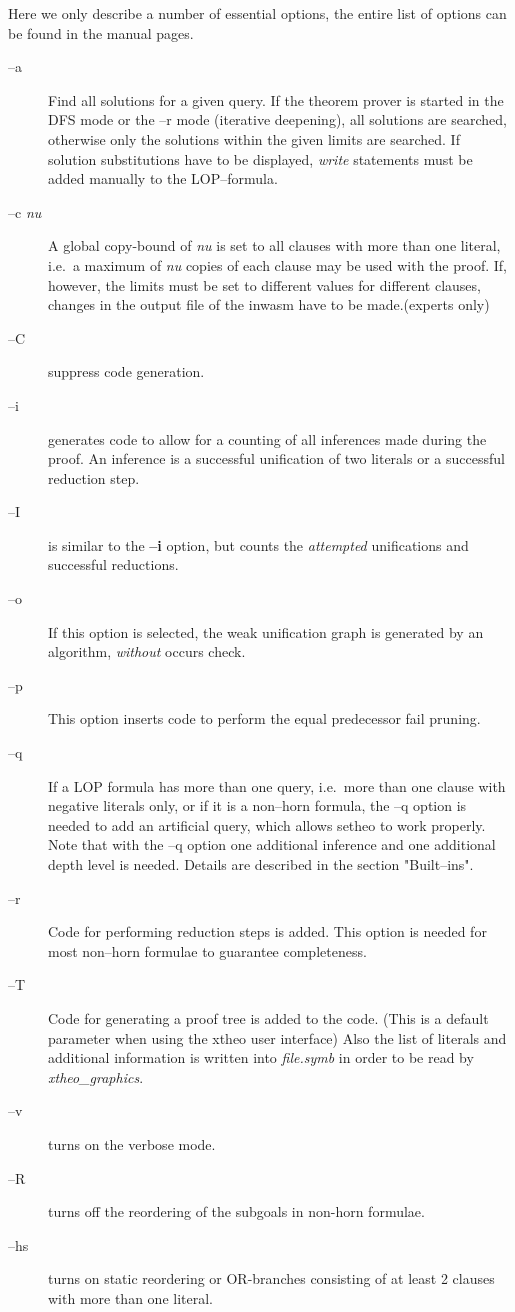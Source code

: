 Here we only describe a number of essential options, the entire list of
options can be found in the manual pages.
\begin{description}
\item[--a]
Find all solutions for a given query. If the theorem prover is started
in the DFS mode or the --r mode (iterative deepening), all solutions
are searched, otherwise only the solutions within the given 
limits are searched. If solution substitutions have to be displayed,
{\it write\/} statements must be added manually to the LOP--formula.
\item[--c {\it nu\/}]
A global copy-bound of {\it nu\/} is set to all clauses with more than
one literal, i.e.\ a maximum of {\it nu\/} copies of each clause may be
used with the proof. If, however, the limits must be set to different values
for different clauses, changes in the output file of the inwasm have to
be made.(experts only)
\item[--C] suppress code generation.
\item[--i] generates code to allow for a counting of all inferences
made during the proof. An inference is a successful unification of two
literals or a successful reduction step.
\item[--I] is similar to the {\bf --i} option, but counts the {\em attempted\/}
unifications and successful reductions.
\item[--o]
If this option is selected, the weak unification graph is generated
by an algorithm, {\it without\/} occurs check.
\item[--p]
This option inserts code to perform the equal predecessor fail pruning.
\item[--q] If a LOP formula has more than one query, i.e.\ more than one
clause with negative literals only, or if it is a non--horn formula,
the --q option is needed to add an artificial query, which allows setheo
to work properly. Note that with the --q option one additional inference
and one additional depth level is needed.
Details are described in the section "Built--ins".
\item[--r] Code for performing reduction steps is added.
This option is needed for most non--horn formulae to guarantee
completeness.
\item[--T] Code for generating a proof tree is added to the code.
(This is a default parameter when using the xtheo user interface)
Also the list of literals and additional information is written
into {\it file.symb\/} in order to be read by {\it xtheo\_graphics}.
\item[--v] turns on the verbose mode.
\item[--R] turns off the reordering of the subgoals in non-horn
formulae.
\item[--hs] turns on static reordering or OR-branches consisting of
at least 2 clauses with more than one literal.
\end{description}

